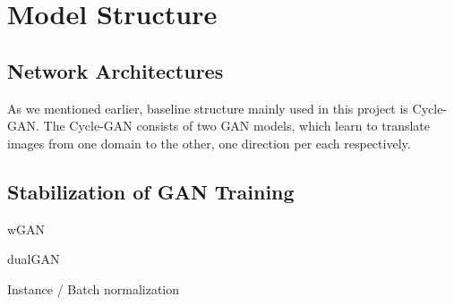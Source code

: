 \chapter{Model Structure}\label{Ch:Result}

\section{Network Architectures}

As we mentioned earlier, baseline structure mainly used in this project is Cycle-GAN. The Cycle-GAN consists of two GAN models, which learn to translate images from one domain to the other, one direction per each respectively. 


\section{Stabilization of GAN Training}

wGAN

dualGAN

Instance / Batch normalization

\endinput

